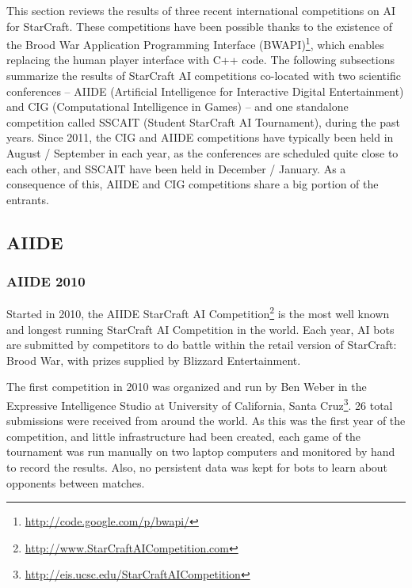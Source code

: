 \documentclass{llncs}
\begin{document}
This section reviews the results of three recent international competitions on AI for StarCraft. These competitions
have been possible thanks to the existence of the Brood War Application Programming Interface 
(BWAPI)\footnote{\url{http://code.google.com/p/bwapi/}}, which 
enables replacing the human player interface with C++ code.
The following subsections summarize the results of StarCraft AI competitions co-located with two scientific conferences -- AIIDE (Artificial Intelligence for Interactive Digital Entertainment) and CIG (Computational Intelligence in Games) -- and one stand\-alone competition called SSCAIT (Student StarCraft AI Tournament), during the past years. Since 2011, the CIG and AIIDE competitions have typically been held in August / September in each year, as the conferences are scheduled quite close to each other, and SSCAIT have been held in December / January. As a consequence of this, AIIDE and CIG competitions share a big portion of the entrants.


\subsection{AIIDE}\label{sec:AIIDE}

\subsubsection{AIIDE 2010}

Started in 2010, the AIIDE StarCraft AI Competition\footnote{\url{http://www.StarCraftAICompetition.com}} is the most
well known and longest running StarCraft AI Competition in the world. Each year,
AI bots are submitted by competitors to do battle within the retail version of
StarCraft: Brood War, with prizes supplied by Blizzard Entertainment. %


The first competition in 2010 was organized and run by Ben Weber in the Expressive
Intelligence Studio at University of California, Santa Cruz\footnote{\url{http://eis.ucsc.edu/StarCraftAICompetition}}. 26 total submissions
were received from around the world. As this was the first year of the competition,
and little infrastructure had been created, each game of the tournament was run 
manually on two laptop computers and monitored by hand to record the results. Also,
no persistent data was kept for bots to learn about opponents between matches.
\end{document}

